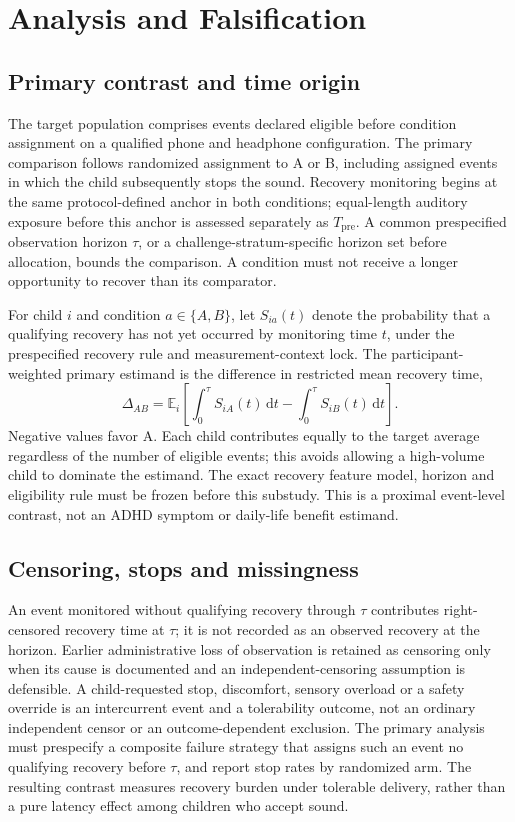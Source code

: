 \section{Analysis and Falsification}

\subsection{Primary contrast and time origin}

The target population comprises events declared eligible before condition assignment on a qualified phone and headphone configuration. The primary comparison follows randomized assignment to A or B, including assigned events in which the child subsequently stops the sound. Recovery monitoring begins at the same protocol-defined anchor in both conditions; equal-length auditory exposure before this anchor is assessed separately as \(T_{\mathrm{pre}}\). A common prespecified observation horizon \(\tau\), or a challenge-stratum-specific horizon set before allocation, bounds the comparison. A condition must not receive a longer opportunity to recover than its comparator.

For child \(i\) and condition \(a\in\{A,B\}\), let \(S_{ia}(t)\) denote the probability that a qualifying recovery has not yet occurred by monitoring time \(t\), under the prespecified recovery rule and measurement-context lock. The participant-weighted primary estimand is the difference in restricted mean recovery time,
\[
\Delta_{AB}
= \mathbb{E}_{i}\left[
\int_0^\tau S_{iA}(t)\,\mathrm{d}t
-
\int_0^\tau S_{iB}(t)\,\mathrm{d}t
\right].
\]
Negative values favor A. Each child contributes equally to the target average regardless of the number of eligible events; this avoids allowing a high-volume child to dominate the estimand. The exact recovery feature model, horizon and eligibility rule must be frozen before this substudy. This is a proximal event-level contrast, not an ADHD symptom or daily-life benefit estimand.

\subsection{Censoring, stops and missingness}

An event monitored without qualifying recovery through \(\tau\) contributes right-censored recovery time at \(\tau\); it is not recorded as an observed recovery at the horizon. Earlier administrative loss of observation is retained as censoring only when its cause is documented and an independent-censoring assumption is defensible. A child-requested stop, discomfort, sensory overload or a safety override is an intercurrent event and a tolerability outcome, not an ordinary independent censor or an outcome-dependent exclusion. The primary analysis must prespecify a composite failure strategy that assigns such an event no qualifying recovery before \(\tau\), and report stop rates by randomized arm. The resulting contrast measures recovery burden under tolerable delivery, rather than a pure latency effect among children who accept sound.

